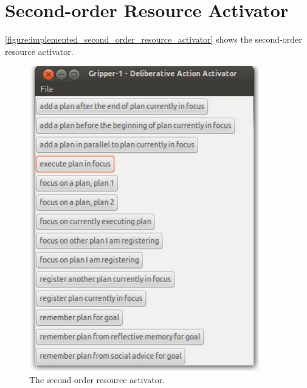 \section{Second-order Resource Activator}

{\mbox{\autoref{figure:implemented_second_order_resource_activator}}}
shows the second-order resource activator.
\begin{figure}
\begin{center}
\includegraphics[width=10cm]{gfx/implemented_second_order_resource_activator}
\end{center}
\caption[The second-order resource activator.]{The second-order
  resource activator.}
\label{figure:implemented_second_order_resource_activator}
\end{figure}

